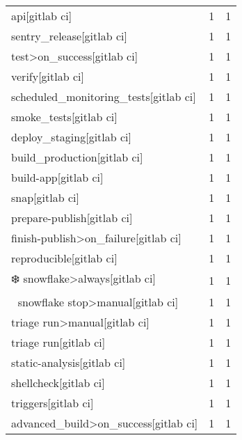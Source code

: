 \begin{tabular}{lrr}
api[gitlab ci]                             &                   1 &             1 \\
sentry\_release[gitlab ci]                  &                   1 &             1 \\
test>on\_success[gitlab ci]                 &                   1 &             1 \\
verify[gitlab ci]                          &                   1 &             1 \\
scheduled\_monitoring\_tests[gitlab ci]      &                   1 &             1 \\
smoke\_tests[gitlab ci]                     &                   1 &             1 \\
deploy\_staging[gitlab ci]                  &                   1 &             1 \\
build\_production[gitlab ci]                &                   1 &             1 \\
build-app[gitlab ci]                       &                   1 &             1 \\
snap[gitlab ci]                            &                   1 &             1 \\
prepare-publish[gitlab ci]                 &                   1 &             1 \\
finish-publish>on\_failure[gitlab ci]       &                   1 &             1 \\
reproducible[gitlab ci]                    &                   1 &             1 \\
❄️ snowflake>always[gitlab ci]             &                   1 &             1 \\
🛑 snowflake stop>manual[gitlab ci]         &                   1 &             1 \\
triage run>manual[gitlab ci]               &                   1 &             1 \\
triage run[gitlab ci]                      &                   1 &             1 \\
static-analysis[gitlab ci]                 &                   1 &             1 \\
shellcheck[gitlab ci]                      &                   1 &             1 \\
triggers[gitlab ci]                        &                   1 &             1 \\
advanced\_build>on\_success[gitlab ci]       &                   1 &             1 \\

\end{tabular}
